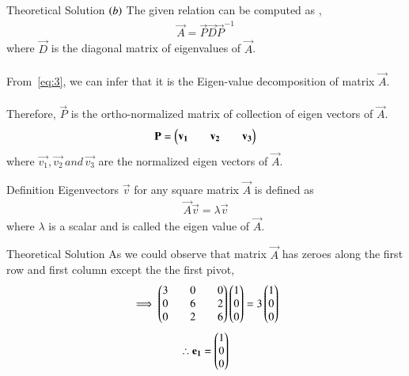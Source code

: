 \documentclass{beamer}
\begin{document}
\begin{frame}{Theoretical Solution}
$\left(b\right)$ The given relation can be computed as ,
\begin{align}
    \vec{A}=\vec{P}\vec{D}\vec{P}^{-1} \label{eq:3}
\end{align}
where $\vec{D}$ is the diagonal matrix of eigenvalues of $\vec{A}$.\\
\\
From~\eqref{eq:3}, we can infer that it is the Eigen-value decomposition of matrix $\vec{A}$.\\
\\
Therefore, $\vec{P}$ is the ortho-normalized matrix of collection of eigen vectors of $\vec{A}$.
\begin{align}
    \mathbf{P}=\begin{pmatrix}\mathbf{v_1}&&\mathbf{v_2}&&\mathbf{v_3}\end{pmatrix}
\end{align}
where $\vec{v_1},\vec{v_2} \,and\, \vec{v_3}$ are the normalized eigen vectors of $\vec{A}$.
\end{frame}

\begin{frame}{Definition}
Eigenvectors $\vec{v}$ for any square matrix $\vec{A}$ is defined as 
\begin{align}
    \vec{A}\vec{v}=\lambda\vec{v}
\end{align}
where $\lambda$ is a scalar and is called the eigen value of $\vec{A}$.
\end{frame}

\begin{frame}{Theoretical Solution}
As we could observe that matrix $\vec{A}$ has zeroes along the first row and first column except the the first pivot,
\begin{align}
     \implies \begin{pmatrix}3&&0&&0\\0&&6&&2\\0&&2&&6\end{pmatrix}\begin{pmatrix}1\\0\\0\end{pmatrix}=3\begin{pmatrix}1\\0\\0\end{pmatrix}
\end{align}
\begin{align}
    \therefore \mathbf{e_1}=\begin{pmatrix}1\\0\\0\end{pmatrix}
\end{align}
\end{frame}
\end{document}
